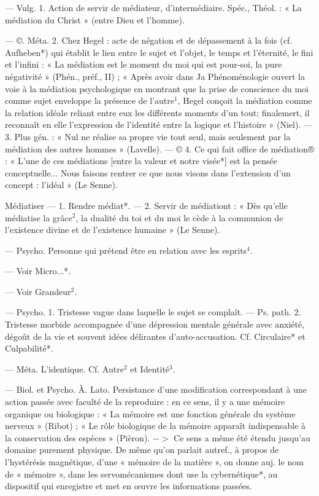 \begin{itemize}[leftmargin=1cm, label=, itemsep=1pt]
 — Vulg. 1. Action de
servir de médiateur, d’intermédiaire.
Spéc., Théol. : « La médiation du
Christ » (entre Dieu et l'homme).

— ©. Méta. 2. Chez Hegel : acte
de négation et de dépassement à la
fois (cf. Aufheben*) qui établit le
lien entre le sujet et l’objet, le temps
et l'éternité, le fini et l'infini : « La
médiation est le moment du moi qui
est pour-soi, la pure négativité »
(Phén., préf., II) ; « Après avoir dans
Ja Phénoménologie ouvert la voie à
la médiation psychologique en montrant que la prise de conscience du
moi comme sujet enveloppe la présence de l’autre$^1$, Hegel conçoit la
médiation comme la relation idéale
reliant entre eux les différents moments d’un tout; finalemert, il
reconnaît en elle l'expression de
l'identité entre la logique et l’histoire » (Niel). — 3. Plus gén. : « Nul
ne réalise sa propre vie tout seul,
mais seulement par la médiation des
autres hommes » (Lavelle). —
© 4. Ce qui fait office de médiation® :
« L’une de ces médiations [entre la
valeur et notre visée*] est la pensée
conceptuelle... Nous faisons rentrer
ce que nous visons dans l’extension
d’un concept : l’idéal » (Le Senne).

\ib{}Médiatiser — 1. Rendre médiat*. —
2. Servir de médiationt : « Dès
qu'elle médiatise la grâce$^2$, la dualité du toi et du moi le cède à la
communion de l'existence divine et
de l’existence humaine » (Le Senne).

 — Psycho. Personne qui
prétend être en relation avec les
esprits$^4$.

 — Voir Micro...*.

 — Voir Grandeur$^2$.

 — Psycho. 1. Tristesse
vague dans laquelle le sujet se complaît. — Ps. path. 2. Tristesse morbide accompagnée d’une dépression mentale générale avec anxiété,
dégoût de la vie et souvent idées
délirantes d’auto-accusation. Cf. Circulaire* et Culpabilité*.

 — Méta. L'identique. Cf.
Autre$^2$ et Identité$^3$.

 — Biol. et Psycho. À. Lato.
Persistance d’une modification correspondant à une action passée avec
faculté de la reproduire : en ce sens,
il y a une mémoire organique ou
biologique : « La mémoire est une
fonction générale du système nerveux » (Ribot) ; « Le rôle biologique
de la mémoire apparaît indispensable à la conservation des espèces »
(Pièron). $->$ Ce sens a même été
étendu jusqu’au domaine purement
physique. De même qu’on parlait
autref., à propos de l'hystérésis
magnétique, d’une « mémoire de la
matière », on donne auj. le nom de
« mémoire », dans les servomécanismes dont use la cybernétique*,
au dispositif qui enregistre et met
en œuvre les informations passées.


\end{itemize}
